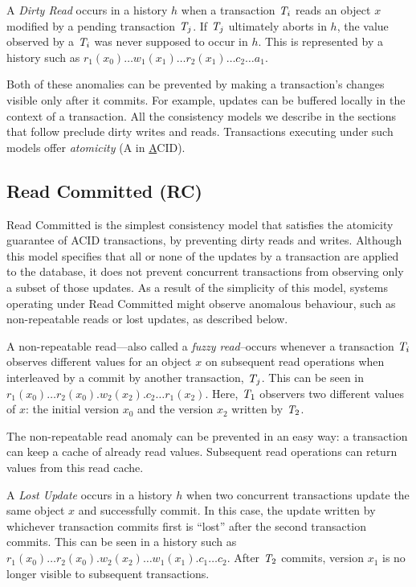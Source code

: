 \begin{definition}
A \emph{Dirty Read} occurs in a history $h$ when a transaction $\mathit{T}_i$ reads an object $x$ modified by a pending transaction $\mathit{T}_j$. If $\mathit{T}_j$ ultimately aborts in $h$, the value observed by a $\mathit{T}_i$ was never supposed to occur in $h$. This is represented by a history such as $r_1(x_0)\ldots w_1(x_1)\ldots r_2(x_1)\ldots c_2\ldots a_1$.
\end{definition}

Both of these anomalies can be prevented by making a transaction's changes visible only after it commits. For example, updates can be buffered locally in the context of a transaction. All the consistency models we describe in the sections that follow preclude dirty writes and reads. Transactions executing under such models offer \emph{atomicity} (A in \underline{A}CID).

\subsection{Read Committed (RC)}

Read Committed is the simplest consistency model that satisfies the atomicity guarantee of ACID transactions, by preventing dirty reads and writes. Although this model specifies that all or none of the updates by a transaction are applied to the database, it does not prevent concurrent transactions from observing only a subset of those updates. As a result of the simplicity of this model, systems operating under Read Committed might observe anomalous behaviour, such as non-repeatable reads or lost updates, as described below.

\begin{definition}
A non-repeatable read---also called a \emph{fuzzy read}--occurs whenever a transaction $\mathit{T}_i$ observes different values for an object $x$ on subsequent read operations when interleaved by a commit by another transaction, $\mathit{T}_j$. This can be seen in $r_1(x_0)\ldots r_2(x_0).w_2(x_2).c_2 \ldots r_1(x_2)$. Here, $\mathit{T}_1$ observers two different values of $x$: the initial version $x_0$ and the version $x_2$ written by $\mathit{T}_2$.
\end{definition}

The non-repeatable read anomaly can be prevented in an easy way: a transaction can keep a cache of already read values. Subsequent read operations can return values from this read cache.

\begin{definition}
A \emph{Lost Update} occurs in a history $h$ when two concurrent transactions update the same object $x$ and successfully commit. In this case, the update written by whichever transaction commits first is ``lost'' after the second transaction commits. This can be seen in a history such as $r_1(x_0)\ldots r_2(x_0).w_2(x_2) \ldots w_1(x_1).c_1\ldots c_2$. After $\mathit{T}_2$ commits, version $x_1$ is no longer visible to subsequent transactions.
\end{definition}

